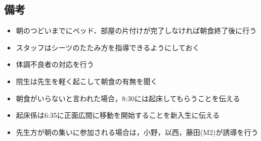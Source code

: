\subsection{備考}
\begin{itemize}
\item 朝のつどいまでにベッド、部屋の片付けが完了しなければ朝食終了後に行う
\item スタッフはシーツのたたみ方を指導できるようにしておく
\item 体調不良者の対応を行う
\item 院生は先生を軽く起こして朝食の有無を聞く
\item 朝食がいらないと言われた場合，8:30には起床してもらうことを伝える
\item 起床係は6:35に正面広間に移動を開始することを新入生に伝える
\item 先生方が朝の集いに参加される場合は，小野，以西，藤田(M2)が誘導を行う

\end{itemize}

%
